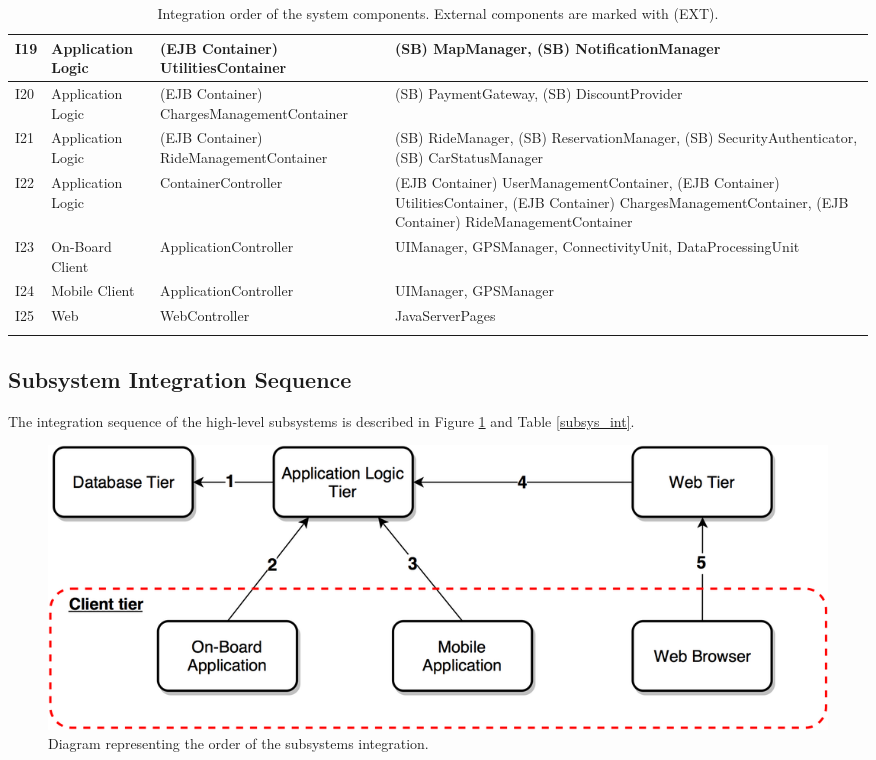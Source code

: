 \begin{longtable}{p{} | p{} | p{} | p{}}
\hline
I19 & Application Logic & (EJB Container) UtilitiesContainer & (SB) MapManager, (SB) NotificationManager \\
\hline
I20 & Application Logic & (EJB Container) ChargesManagementContainer & (SB) PaymentGateway, (SB) DiscountProvider \\
\hline
I21 & Application Logic & (EJB Container) RideManagementContainer & (SB) RideManager, (SB) ReservationManager, (SB) SecurityAuthenticator, (SB) CarStatusManager \\
\hline
I22 & Application Logic & ContainerController & (EJB Container) UserManagementContainer, (EJB Container) UtilitiesContainer, (EJB Container) ChargesManagementContainer, (EJB Container) RideManagementContainer \\
\hline
I23 & On-Board Client & ApplicationController & UIManager, GPSManager, ConnectivityUnit, DataProcessingUnit \\
\hline
I24 & Mobile Client & ApplicationController & UIManager, GPSManager \\
\hline
I25 & Web & WebController & JavaServerPages \\
\hline
\caption{Integration order of the system components. External components are marked with (EXT).}
\label{software_int}
\end{longtable}

\subsection{Subsystem Integration Sequence}
The integration sequence of the high-level subsystems is described in Figure \ref{h_level_subsys} and Table \ref{subsys_int}.

\begin{figure}[H]
\begin{center}
		\includegraphics[width=\textwidth]{./integration_strategy/diagrams/h_level_subsys.png}
		\caption{Diagram representing the order of the subsystems integration.}
		\label{h_level_subsys}
\end{center}
\end{figure}

